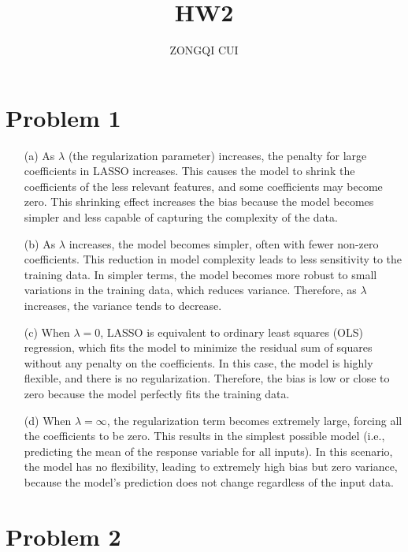 \documentclass[10pt,letterpaper]{article}
\title{HW2}
\author{ZONGQI CUI}
\begin{document}
\maketitle
    \section{Problem 1}
        \begin{itemize}
            \item[(a)] As $\lambda$ (the regularization parameter) increases, the penalty for large coefficients in LASSO increases.
            This causes the model to shrink the coefficients of the less relevant features, and some coefficients may become zero. 
            This shrinking effect increases the bias because the model becomes simpler and less capable of capturing the complexity of the data.
            \item[(b)] As $\lambda$ increases, the model becomes simpler, often with fewer non-zero coefficients.
            This reduction in model complexity leads to less sensitivity to the training data.
            In simpler terms, the model becomes more robust to small variations in the training data, which reduces variance. Therefore, as $\lambda$ increases, the variance tends to decrease.
            \item[(c)] When $\lambda = 0$, LASSO is equivalent to ordinary least squares (OLS) regression, which fits the model to minimize the residual sum of squares without any penalty on the coefficients. In this case, the model is highly flexible, and there is no regularization. Therefore, the bias is low or close to zero because the model perfectly fits the training data.
            \item[(d)] When $\lambda = \infty $, the regularization term becomes extremely large, forcing all the coefficients to be zero. This results in the simplest possible model (i.e., predicting the mean of the response variable for all inputs). In this scenario, the model has no flexibility, leading to extremely high bias but zero variance, because the model's prediction does not change regardless of the input data.
        \end{itemize}
    \section{Problem 2}
        
\end{document}
